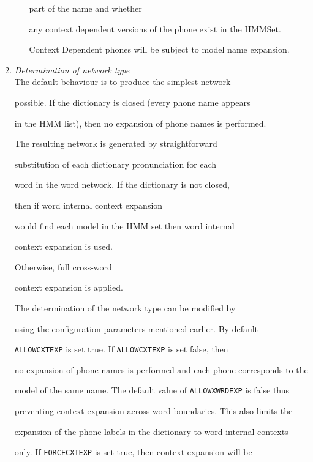 \begin{enumerate}
\begin{enumerate}
        part of the name and whether


        any context dependent versions of the phone exist in the HMMSet.


         Context Dependent phones will be subject to model name expansion.


\end{enumerate}





\item \textit{Determination of network type} \\


The default behaviour is to produce the simplest network


possible. If the dictionary is closed (every phone name appears


in the HMM list), then no expansion of phone names is performed.


The resulting network is generated by straightforward


substitution of each dictionary pronunciation for each


word in the word network.  If the dictionary is not closed, 


then if word internal context expansion


would find each model in the HMM set then  word internal 


context expansion is used.


Otherwise, full cross-word


context expansion is applied.





The determination of the network type can be modified by


using the configuration parameters mentioned earlier.  By default


\texttt{ALLOWCXTEXP} is set true. If \texttt{ALLOWCXTEXP} is set false, then 


no expansion of phone names is performed and each phone corresponds to the


model of the same name. The default value of \texttt{ALLOWXWRDEXP} is false thus


preventing context expansion across word boundaries. This also limits the


expansion of the phone labels in the dictionary to word internal contexts


only. If \texttt{FORCECXTEXP} is set true, then context expansion will be



\end{enumerate}
